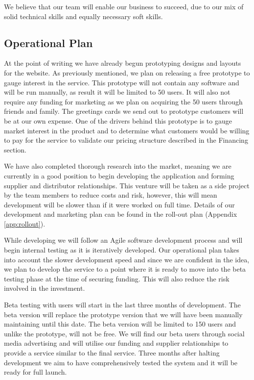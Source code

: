 \documentclass[10pt,a4paper]{article}
\begin{document}
We believe that our team will enable our business to succeed, due to our mix of solid  technical skills and equally necessary soft skills.

\subsection*{Operational Plan}
At the point of writing we have already begun prototyping designs and layouts for the website. As previously mentioned, we plan on releasing a free prototype to gauge interest in the service. This prototype will not contain any software and will be run manually, as result it will be limited to 50 users. It will also not require any funding for marketing as we plan on acquiring the 50 users through friends and family. The greetings cards we send out to prototype customers will be at our own expense. One of the drivers behind this prototype is to gauge market interest in the product and to determine what customers would be willing to pay for the service to validate our pricing structure described in the Financing section.

We have also completed thorough research into the market, meaning we are currently in a good position to begin developing the application and forming supplier and distributor relationships. This venture will be taken as a side project by the team members to reduce costs and risk, however, this will mean development will be slower than if it were worked on full time. Details of our development and marketing plan can be found in the roll-out plan (Appendix \ref{app:rollout}).

While developing we will follow an Agile software development process and will begin internal testing as it is iteratively developed. Our operational plan takes into account the slower development speed and since we are confident in the idea, we plan to develop the service to a point where it is ready to move into the beta testing phase at the time of securing funding. This will also reduce the risk involved in the investment.

Beta testing with users will start in the last three months of development. The beta version will replace the prototype version that we will have been manually maintaining until this date. The beta version will be limited to 150 users and unlike the prototype, will not be free. We will find our beta users through social media advertising and will utilise our funding and supplier relationships to provide a service similar to the final service. Three months after halting development we aim to have comprehensively tested the system and it will be ready for full launch.
\end{document}
